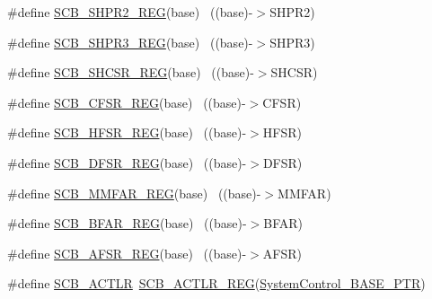 \begin{DoxyCompactItemize}
\item 
\#define \hyperlink{group___s_c_b___register___accessor___macros_gaeb160566ffdd3572f046e69f3b79e3e8}{S\+C\+B\+\_\+\+S\+H\+P\+R2\+\_\+\+R\+EG}(base)                                        ~((base)-\/$>$S\+H\+P\+R2)
\item 
\#define \hyperlink{group___s_c_b___register___accessor___macros_ga8c93949e94df4ece6b4fafd94cca708d}{S\+C\+B\+\_\+\+S\+H\+P\+R3\+\_\+\+R\+EG}(base)                                        ~((base)-\/$>$S\+H\+P\+R3)
\item 
\#define \hyperlink{group___s_c_b___register___accessor___macros_ga84042bf531b908ba8afa2bb260acfdb1}{S\+C\+B\+\_\+\+S\+H\+C\+S\+R\+\_\+\+R\+EG}(base)                                        ~((base)-\/$>$S\+H\+C\+SR)
\item 
\#define \hyperlink{group___s_c_b___register___accessor___macros_ga5e429651ec37af4146f8ac231cb483be}{S\+C\+B\+\_\+\+C\+F\+S\+R\+\_\+\+R\+EG}(base)                                          ~((base)-\/$>$C\+F\+SR)
\item 
\#define \hyperlink{group___s_c_b___register___accessor___macros_ga82f9f02807dd20f1f97226fcbeb5771e}{S\+C\+B\+\_\+\+H\+F\+S\+R\+\_\+\+R\+EG}(base)                                          ~((base)-\/$>$H\+F\+SR)
\item 
\#define \hyperlink{group___s_c_b___register___accessor___macros_ga2ac45bf07176acb69b71189cddba46dc}{S\+C\+B\+\_\+\+D\+F\+S\+R\+\_\+\+R\+EG}(base)                                          ~((base)-\/$>$D\+F\+SR)
\item 
\#define \hyperlink{group___s_c_b___register___accessor___macros_gafbf4831267e040e9b4710ae9fb63c2c9}{S\+C\+B\+\_\+\+M\+M\+F\+A\+R\+\_\+\+R\+EG}(base)                                        ~((base)-\/$>$M\+M\+F\+AR)
\item 
\#define \hyperlink{group___s_c_b___register___accessor___macros_ga9932d2c86e9f7cd72b4fbca18863e757}{S\+C\+B\+\_\+\+B\+F\+A\+R\+\_\+\+R\+EG}(base)                                          ~((base)-\/$>$B\+F\+AR)
\item 
\#define \hyperlink{group___s_c_b___register___accessor___macros_ga9835a953f824d051f48ab361ba7ec70c}{S\+C\+B\+\_\+\+A\+F\+S\+R\+\_\+\+R\+EG}(base)                                          ~((base)-\/$>$A\+F\+SR)
\item 
\#define \hyperlink{group___s_c_b___register___accessor___macros_ga2a94c61032c2b326d148f402585f66f4}{S\+C\+B\+\_\+\+A\+C\+T\+LR}~\hyperlink{group___s_c_b___register___accessor___macros_gacc7b0065f69b9a0d772af30505d9d5e8}{S\+C\+B\+\_\+\+A\+C\+T\+L\+R\+\_\+\+R\+EG}(\hyperlink{group___s_c_b___peripheral_gaf22864785770f832103e904244e078cb}{System\+Control\+\_\+\+B\+A\+S\+E\+\_\+\+P\+TR})

\end{DoxyCompactItemize}
